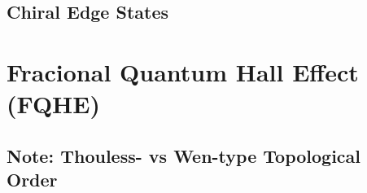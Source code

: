 \documentclass[11pt]{article}
\begin{document}
\subsection{Chiral Edge States}


\pagebreak
\section{Fracional Quantum Hall Effect (FQHE)}

\subsection{Note: Thouless- vs Wen-type Topological Order}




\newpage
\vskip 0.5cm
\end{document}
